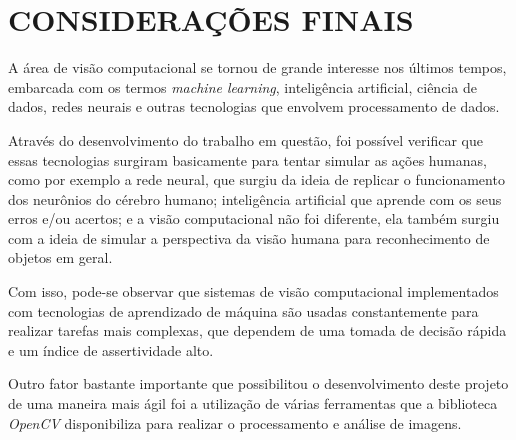 \chapter{\textbf{CONSIDERAÇÕES FINAIS}}
\label{consideracoes_finais}

A área de visão computacional se tornou de grande interesse nos últimos tempos, embarcada com os termos \textit{machine learning}, inteligência artificial, ciência de dados, redes neurais e outras tecnologias que envolvem processamento de dados.

Através do desenvolvimento do trabalho em questão, foi possível verificar que essas tecnologias surgiram basicamente para tentar simular as ações humanas, como por exemplo a rede neural, que surgiu da ideia de replicar o funcionamento dos neurônios do cérebro humano; inteligência artificial que aprende com os seus erros e/ou acertos; e a visão computacional não foi diferente, ela também surgiu com a ideia de simular a perspectiva da visão humana para reconhecimento de objetos em geral.

Com isso, pode-se observar que sistemas de visão computacional implementados com tecnologias de aprendizado de máquina são usadas constantemente para realizar tarefas mais complexas, que dependem de uma tomada de decisão rápida e um índice de assertividade alto.



Outro fator bastante importante que possibilitou o desenvolvimento deste projeto de uma maneira mais ágil foi a utilização de várias ferramentas que a biblioteca \textit{OpenCV} disponibiliza para realizar o processamento e análise de imagens.



